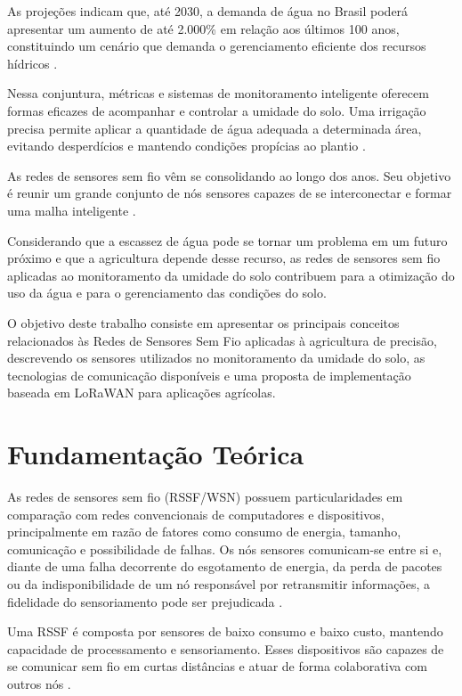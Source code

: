 \documentclass[conference]{IEEEtran}
\begin{document}
As projeções indicam que, até 2030, a demanda de água no Brasil poderá apresentar um aumento de até 2.000\% em relação aos últimos 100 anos, constituindo um cenário que demanda o gerenciamento eficiente dos recursos hídricos \cite{silva2024}.

Nessa conjuntura, métricas e sistemas de monitoramento inteligente oferecem formas eficazes de acompanhar e controlar a umidade do solo. Uma irrigação precisa permite aplicar a quantidade de água adequada a determinada área, evitando desperdícios e mantendo condições propícias ao plantio \cite{silva2024}.

As redes de sensores sem fio vêm se consolidando ao longo dos anos. Seu objetivo é reunir um grande conjunto de nós sensores capazes de se interconectar e formar uma malha inteligente \cite{gta2002}.

Considerando que a escassez de água pode se tornar um problema em um futuro próximo e que a agricultura depende desse recurso, as redes de sensores sem fio aplicadas ao monitoramento da umidade do solo contribuem para a otimização do uso da água e para o gerenciamento das condições do solo.

O objetivo deste trabalho consiste em apresentar os principais conceitos relacionados às Redes de Sensores Sem Fio aplicadas à agricultura de precisão, descrevendo os sensores utilizados no monitoramento da umidade do solo, as tecnologias de comunicação disponíveis e uma proposta de implementação baseada em LoRaWAN para aplicações agrícolas.

\section{Fundamentação Teórica}

As redes de sensores sem fio (RSSF/WSN) possuem particularidades em comparação com redes convencionais de computadores e dispositivos, principalmente em razão de fatores como consumo de energia, tamanho, comunicação e possibilidade de falhas. Os nós sensores comunicam-se entre si e, diante de uma falha decorrente do esgotamento de energia, da perda de pacotes ou da indisponibilidade de um nó responsável por retransmitir informações, a fidelidade do sensoriamento pode ser prejudicada \cite{loureiro2003}.

Uma RSSF é composta por sensores de baixo consumo e baixo custo, mantendo capacidade de processamento e sensoriamento. Esses dispositivos são capazes de se comunicar sem fio em curtas distâncias e atuar de forma colaborativa com outros nós \cite{akyildiz2002}.
\end{document}
